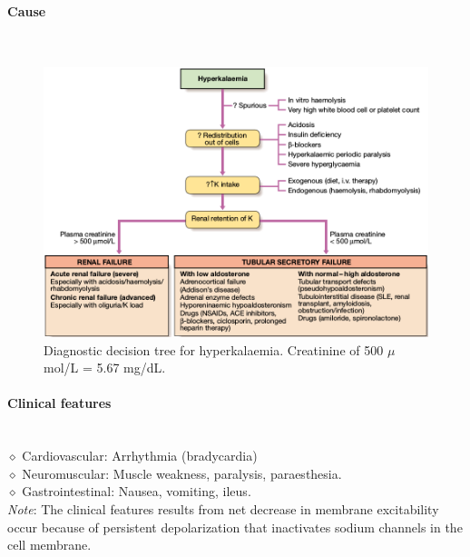 \documentclass[11pt,a4paper]{report}
\begin{document}
\begin{enumerate}
	\paragraph{Cause} ~\\
	\begin{figure}[htp]
		\centering \includegraphics[scale=0.44]{hyperk.png}
		\centering \caption[Hyperkalemia diagnostic decision tree]{Diagnostic decision tree for hyperkalaemia. Creatinine of 500 $\mu$mol/L = 5.67 mg/dL. \cite{walker2010davidson}}
		\label{HyperK}
	\end{figure}
	\paragraph{Clinical features} ~\\
	$\diamond$ Cardiovascular: Arrhythmia (bradycardia)\\
	$\diamond$ Neuromuscular: Muscle weakness, paralysis, paraesthesia.\\
	$\diamond$ Gastrointestinal: Nausea, vomiting, ileus. \\
	
	\noindent \textit{\color{red}Note}: The clinical features results from net decrease in membrane excitability occur because of persistent depolarization that inactivates sodium channels in the cell membrane.

\end{enumerate}
\end{document}
